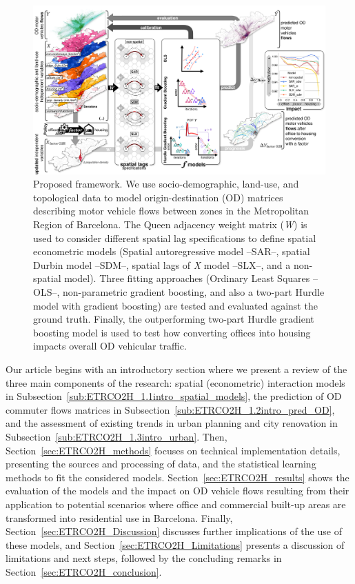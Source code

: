 \begin{figure}[h!]
    \centering
    \includegraphics[width=1\textwidth]{graph_abstr.drawio_v5.jpg}
    \caption{Proposed framework. We use socio-demographic, land-use, and topological data to model origin-destination (OD) matrices describing motor vehicle flows between zones in the Metropolitan Region of Barcelona. The Queen adjacency weight matrix (\emph{W}) is used to consider different spatial lag specifications to define spatial econometric models (Spatial autoregressive model --SAR--, spatial Durbin model --SDM--, spatial lags of \emph{X} model --SLX--, and a non-spatial model). Three fitting approaches (Ordinary Least Squares --OLS--, non-parametric gradient boosting, and also a two-part Hurdle model with gradient boosting) are tested and evaluated against the ground truth. Finally, the outperforming two-part Hurdle gradient boosting model is used to test how converting offices into housing impacts overall OD vehicular traffic.}
    \label{fig:graph_abstract}
\end{figure}

Our article begins with an introductory section where we present a review of the three main components of the research:  spatial (econometric) interaction models in Subsection~\ref{sub:ETRCO2H_1.1intro_spatial_models}, the prediction of OD commuter flows matrices in Subsection~\ref{sub:ETRCO2H_1.2intro_pred_OD}, and the assessment of existing trends in urban planning and city renovation in Subsection~\ref{sub:ETRCO2H_1.3intro_urban}. Then, Section~\ref{sec:ETRCO2H_methods} focuses on technical implementation details, presenting the sources and processing of data, and the statistical learning methods to fit the considered models. Section~\ref{sec:ETRCO2H_results} shows the evaluation of the models and the impact on OD vehicle flows resulting from their application to potential scenarios where office and commercial built-up areas are transformed into residential use in Barcelona. Finally, Section~\ref{sec:ETRCO2H_Discussion} discusses further implications of the use of these models, and Section~\ref{sec:ETRCO2H_Limitations} presents a discussion of limitations and next steps, followed by the concluding remarks in Section~\ref{sec:ETRCO2H_conclusion}.

